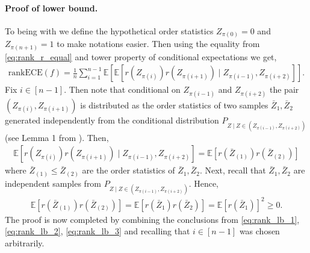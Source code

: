 \documentclass[11pt]{article}
\numberwithin{equation}{section}
\theoremstyle{definition}
\newcommand{\E}{\mathbb{E}}
\newcommand{\rankECE}{\mathrm{rankECE}}
\begin{document}
\paragraph{\textbf{Proof of lower bound.}}
To being with we define the hypothetical order statistics $Z_{\pi(0)} = 0$ and $Z_{\pi(n+1)} = 1$ to make notations easier. Then using the equality from \eqref{eq:rank_r_equal} and tower property of conditional expectations we get,
\begin{align}\label{eq:rank_lb_1}
    \rankECE(f) = \frac{1}{n}\sum_{i=1}^{n-1}\E\left[\E\left[r\left(Z_{\pi(i)}\right)r\left(Z_{\pi(i+1)}\right)\mid Z_{\pi(i-1)}, Z_{\pi(i+2)}\right]\right].
\end{align}
Fix $i\in [n-1]$. Then note that conditional on $Z_{\pi(i-1)}$ and $Z_{\pi(i+2)}$ the pair $\left(Z_{\pi(i)}, Z_{\pi(i+1)}\right)$ is distributed as the order statistics of two samples $\bar Z_1,\bar Z_2$ generated independently from the conditional distribution $P_{Z\mid Z\in \left(Z_{\pi(i-1)}, Z_{\pi(i+2)}\right)}$ (see Lemma 1 from \cite{gupta2021distribution}). Then,
\begin{align}\label{eq:rank_lb_2}
    \E\left[r\left(Z_{\pi(i)}\right)r\left(Z_{\pi(i+1)}\right)\mid Z_{\pi(i-1)}, Z_{\pi(i+2)}\right] = \E\left[r\left(\bar Z_{(1)}\right)r\left(\bar Z_{(2)}\right)\right]
\end{align}
where $\bar Z_{(1)}\leq \bar Z_{(2)}$ are the order statistics of $\bar Z_1, \bar Z_2$. Next, recall that $\bar Z_1,\bar Z_2$ are independent samples from $P_{Z\mid Z\in \left(Z_{\pi(i-1)}, Z_{\pi(i+2)}\right)}$. Hence,
\begin{align}\label{eq:rank_lb_3}
    \E\left[r\left(\bar Z_{(1)}\right)r\left(\bar Z_{(2)}\right)\right] = \E\left[r(\bar Z_1)r(\bar Z_2)\right] = \E[r(\bar Z_1)]^2\geq 0.
\end{align}
The proof is now completed by combining the conclusions from \eqref{eq:rank_lb_1}, \eqref{eq:rank_lb_2}, \eqref{eq:rank_lb_3} and recalling that $i\in [n-1]$ was chosen arbitrarily.
\end{document}
